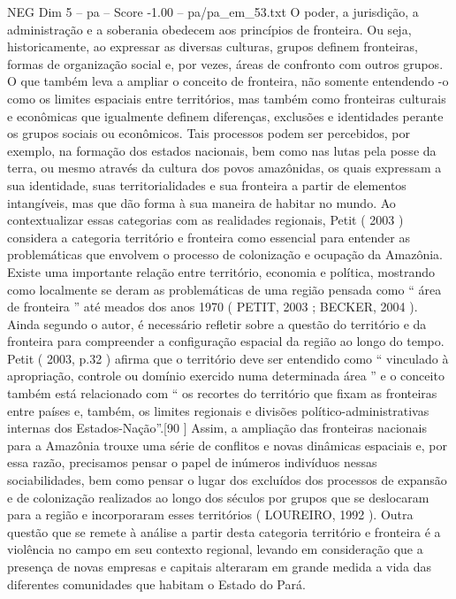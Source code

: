 \begin{textsample}{NEG Dim 5 – pa – Score -1.00 – pa/pa\_em\_53.txt}  \label{ex:f5_neg_049}
O poder, a jurisdição, a administração e a soberania obedecem aos princípios de fronteira.
Ou seja, historicamente, ao expressar as diversas culturas, grupos definem fronteiras, formas de organização social e, por vezes, áreas de confronto com outros grupos.
O que também leva a ampliar o conceito de fronteira, não somente entendendo -o como os limites espaciais entre territórios, mas também como fronteiras culturais e econômicas que igualmente definem diferenças, exclusões e identidades perante os grupos sociais ou econômicos.
Tais processos podem ser percebidos, por exemplo, na formação dos estados nacionais, bem como nas lutas pela posse da terra, ou mesmo através da cultura dos povos amazônidas, os quais expressam a sua identidade, suas territorialidades e sua fronteira a partir de elementos intangíveis, mas que dão forma à sua maneira de habitar no mundo.
Ao contextualizar essas categorias com as realidades regionais, Petit ( 2003 ) considera a categoria território e fronteira como essencial para entender as problemáticas que envolvem o processo de colonização e ocupação da Amazônia.
Existe uma importante relação entre território, economia e política, mostrando como localmente se deram as problemáticas de uma região pensada como “ área de fronteira ” até meados dos anos 1970 ( PETIT, 2003 ; BECKER, 2004 ).
Ainda segundo o autor, é necessário refletir sobre a questão do território e da fronteira para compreender a configuração espacial da região ao longo do tempo.
Petit ( 2003, p.32 ) afirma que o território deve ser entendido como “ vinculado à apropriação, controle ou domínio exercido numa determinada área ” e o conceito também está relacionado com “ os recortes do território que fixam as fronteiras entre países e, também, os limites regionais e divisões político-administrativas internas dos Estados-Nação”.[90 ] Assim, a ampliação das fronteiras nacionais para a Amazônia trouxe uma série de conflitos e novas dinâmicas espaciais e, por essa razão, precisamos pensar o papel de inúmeros indivíduos nessas sociabilidades, bem como pensar o lugar dos excluídos dos processos de expansão e de colonização realizados ao longo dos séculos por grupos que se deslocaram para a região e incorporaram esses territórios ( LOUREIRO, 1992 ).
Outra questão que se remete à análise a partir desta categoria território e fronteira é a violência no campo em seu contexto regional, levando em consideração que a presença de novas empresas e capitais alteraram em grande medida a vida das diferentes comunidades que habitam o Estado do Pará.

\end{textsample}
